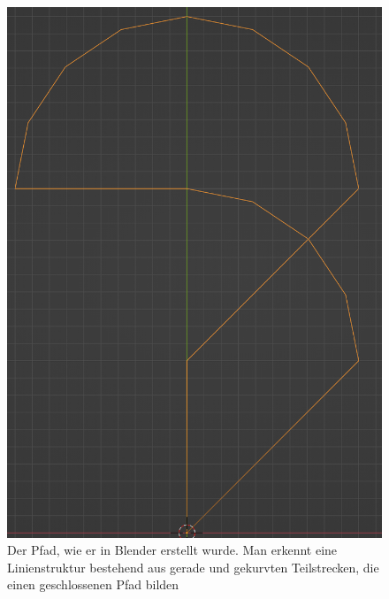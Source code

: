 \documentclass[11pt,a4paper]{article}
\begin{document}
\begin{figure}[ht]
\centering
\includegraphics[scale = 0.6]{pfadgrafik.png}
\caption{Der Pfad, wie er in Blender erstellt wurde. Man erkennt eine Linienstruktur bestehend aus gerade und gekurvten Teilstrecken, die einen geschlossenen Pfad bilden}
\label{fig: MessungExperiment}
\end{figure}
\end{document}
